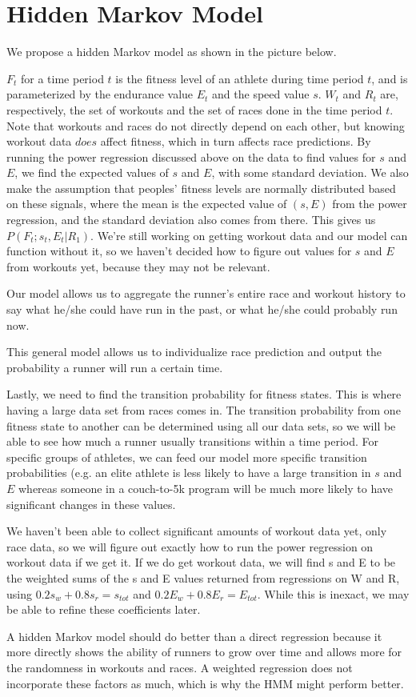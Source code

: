 \documentclass{article}
\begin{document}
\section{Hidden Markov Model}

We propose a hidden Markov model as shown in the picture below.




$F_t$ for a time period $t$ is the fitness level of an athlete during time period $t$, and is parameterized by the endurance value $E_t$ and the speed value $s$. $W_t$ and $R_t$ are, respectively, the set of workouts and the set of races done in the time period $t$.  Note that workouts and races do not directly depend on each other, but knowing workout data $\textit{does}$ affect fitness, which in turn affects race predictions. By running the power regression discussed above on the data to find values for $s$ and $E$, we find the expected values of $s$ and $E$, with some standard deviation. We also make the assumption that peoples' fitness levels are normally distributed based on these signals, where the mean is the expected value of $(s, E)$ from the power regression, and the standard deviation also comes from there. This gives us $P(F_t; s_t, E_t | R_1)$. We're still working on getting workout data and our model can function without it, so we haven't decided how to figure out values for $s$ and $E$ from workouts yet, because they may not be relevant.

Our model allows us to aggregate the runner's entire race and workout history to say what he/she could have run in the past, or what he/she could probably run now.

This general model allows us to individualize race prediction and output the probability a runner will run a certain time.

Lastly, we need to find the transition probability for fitness states. This is where having a large data set from races comes in. The transition probability from one fitness state to another can be determined using all our data sets, so we will be able to see how much a runner usually transitions within a time period. For specific groups of athletes, we can feed our model more specific transition probabilities (e.g. an elite athlete is less likely to have a large transition in $s$ and $E$ whereas someone in a couch-to-5k program will be much more likely to have significant changes in these values.

We haven't been able to collect significant amounts of workout data yet, only race data, so we will figure out exactly how to run the power regression on workout data if we get it. If we do get workout data, we will find s and E to be the weighted sums of the s and E values returned from regressions on W and R, using $0.2s_w + 0.8s_r = s_{tot}$ and $0.2E_w + 0.8E_r = E_{tot}$. While this is inexact, we may be able to refine these coefficients later.


A hidden Markov model should do better than a direct regression because it more directly shows the ability of runners to grow over time and allows more for the randomness in workouts and races. A weighted regression does not incorporate these factors as much, which is why the HMM might perform better.
\end{document}
